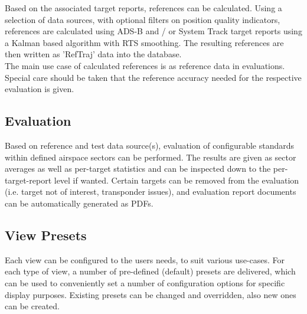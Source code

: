 Based on the associated target reports, references can be calculated. Using a selection of data sources, with optional filters on position quality indicators, references are calculated using ADS-B and / or System Track target reports using a Kalman based algorithm with RTS smoothing. The resulting references are then written as 'RefTraj' data into the database. \\

The main use case of calculated references is as reference data in evaluations. Special care should be taken that the reference accuracy needed for the respective evaluation is given.

\subsection*{Evaluation}

Based on reference and test data source(s), evaluation of configurable standards within defined airspace sectors can be performed. The results are given as sector averages as well as per-target statistics and can be inspected down to the per-target-report level if wanted. Certain targets can be removed from the evaluation (i.e. target not of interest, transponder issues), and evaluation report documents can be automatically generated as PDFs.

\subsection*{View Presets}

Each view can be configured to the users needs, to suit various use-cases. For each type of view, a number of pre-defined (default) presets are delivered, which can be used to conveniently set a number of configuration options for specific display purposes. Existing presets can be changed and overridden, also new ones can be created.

